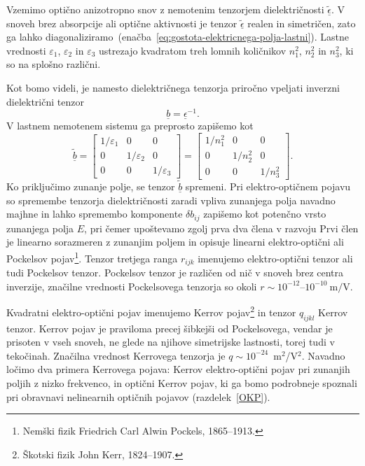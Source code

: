 Vzemimo optično anizotropno snov z nemotenim tenzorjem dielektričnosti  
$\underline{\tilde{\epsilon}}$. V snoveh brez absorpcije ali optične aktivnosti
je tenzor $\underline{\tilde{\epsilon}}$ realen in simetričen, zato ga lahko 
diagonaliziramo~(enačba~\ref{eq:gostota-elektricnega-polja-lastni}). Lastne vrednosti 
$\varepsilon_1$, $\varepsilon_2$ in $\varepsilon_3$ ustrezajo kvadratom treh lomnih
količnikov $n_1^2$, $n_2^2$ in $n_3^2$, ki so na splošno različni.

Kot bomo videli, je namesto dielektričnega tenzorja 
priročno vpeljati inverzni dielektrični tenzor
\begin{equation}
\underline{b}=\underline{\epsilon}^{-1}.
\end{equation}
V lastnem nemotenem sistemu ga preprosto zapišemo kot
\begin{equation}
\underline{\tilde{b}} = \left[\begin{array}{ccc}
1/\varepsilon_1 & 0& 0\\
0 & 1/\varepsilon_2& 0\\
0 & 0&  1/\varepsilon_3
\end{array}\right] = 
\left[\begin{array}{ccc}
1/n_1^2 & 0& 0\\
0 & 1/n_2^2& 0\\
0 & 0&  1/n_3^2
\end{array}\right].
\end{equation}
Ko priključimo zunanje polje, se tenzor $\underline{\tilde{b}}$
spremeni. Pri elektro-optičnem pojavu so spremembe tenzorja dielektričnosti zaradi vpliva
zunanjega polja navadno majhne in lahko spremembo komponente $\delta b_{ij}$ zapišemo kot 
potenčno vrsto zunanjega polja $E$, 
pri čemer upoštevamo zgolj prva dva člena v razvoju
Prvi člen je linearno sorazmeren z zunanjim poljem in opisuje linearni elektro-optični
ali Pockelsov pojav\footnote{Nemški fizik Friedrich Carl Alwin Pockels, 1865--1913.}. 
Tenzor tretjega ranga $r_{ijk}$ imenujemo elektro-optični 
tenzor
ali tudi Pockelsov tenzor. 
Pockelsov tenzor je različen od nič v snoveh brez centra inverzije, značilne vrednosti Pockelsovega
tenzorja so okoli $r \sim 10^{-12}$--$10^{-10}~\si{\m/\V}$.

Kvadratni elektro-optični pojav imenujemo Kerrov
pojav\footnote{Škotski fizik John Kerr, 1824--1907.} in tenzor $q_{ijkl}$ 
Kerrov tenzor. Kerrov pojav je praviloma precej šibkejši od Pockelsovega, vendar je prisoten 
v vseh snoveh, ne glede na njihove simetrijske lastnosti, torej tudi v tekočinah. 
Značilna vrednost Kerrovega tenzorja je $q \sim 10^{-24}$~m$^2$/V$^2$. 
Navadno ločimo dva primera Kerrovega pojava: Kerrov elektro-optični pojav 
pri zunanjih poljih z nizko frekvenco, in optični Kerrov pojav, ki ga bomo  
podrobneje spoznali pri obravnavi nelinearnih optičnih pojavov (razdelek~\ref{OKP}).

